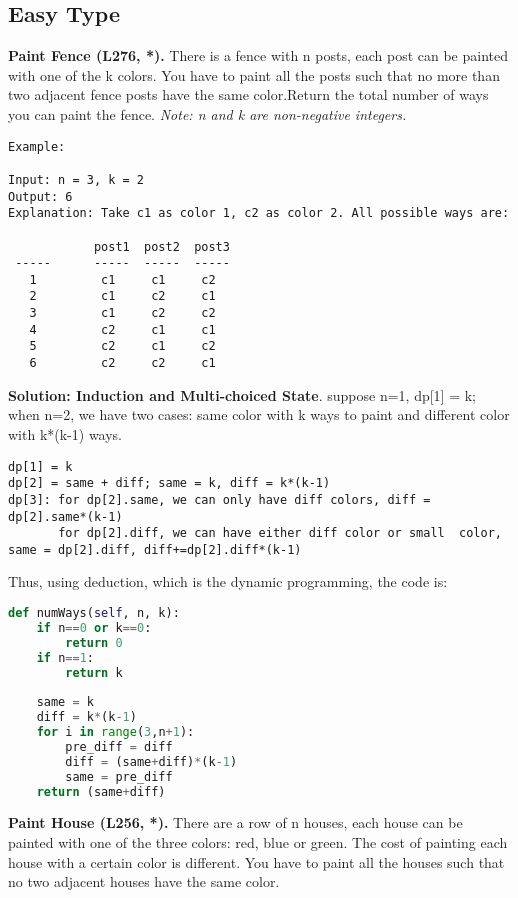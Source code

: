 \documentclass[../main.tex]{subfiles}
\begin{document}
\subsection{Easy Type}
\begin{examples}
\item \textbf{Paint Fence (L276, *).} There is a fence with n posts, each post can be painted with one of the k colors. You have to paint all the posts such that no more than two adjacent fence posts have the same color.Return the total number of ways you can paint the fence. \textit{Note: n and k are non-negative integers.}
\begin{lstlisting}[numbers=none]
Example:

Input: n = 3, k = 2
Output: 6
Explanation: Take c1 as color 1, c2 as color 2. All possible ways are:

            post1  post2  post3      
 -----      -----  -----  -----       
   1         c1     c1     c2 
   2         c1     c2     c1 
   3         c1     c2     c2 
   4         c2     c1     c1  
   5         c2     c1     c2
   6         c2     c2     c1
\end{lstlisting}
\textbf{Solution: Induction and Multi-choiced State}. suppose n=1, dp[1] = k; when n=2, we have two cases: same color with k ways to paint and different color with k*(k-1) ways. 
\begin{lstlisting}[numbers=none]
dp[1] = k
dp[2] = same + diff; same = k, diff = k*(k-1)
dp[3]: for dp[2].same, we can only have diff colors, diff = dp[2].same*(k-1)
       for dp[2].diff, we can have either diff color or small  color, same = dp[2].diff, diff+=dp[2].diff*(k-1)
\end{lstlisting}
Thus, using deduction, which is the dynamic programming, the code is:
\begin{lstlisting}[language=Python]
def numWays(self, n, k):
    if n==0 or k==0:
        return 0
    if n==1:
        return k
    
    same = k
    diff = k*(k-1)
    for i in range(3,n+1):
        pre_diff = diff
        diff = (same+diff)*(k-1)
        same = pre_diff
    return (same+diff)
\end{lstlisting}
\item \textbf{Paint House (L256, *).} There are a row of n houses, each house can be painted with one of the three colors: red, blue or green. The cost of painting each house with a certain color is different. You have to paint all the houses such that no two adjacent houses have the same color.


\end{examples}
\end{document}

